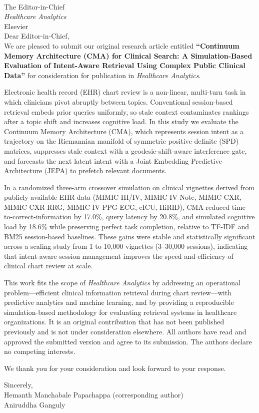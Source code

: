 \documentclass[12pt]{article}
\begin{document}
\begin{flushleft}
[Date]\\[2em]
\end{flushleft}

The Editor-in-Chief\\
\textit{Healthcare Analytics}\\
Elsevier\\[2em]

Dear Editor-in-Chief,\\[1em]

We are pleased to submit our original research article entitled \textbf{``Continuum Memory Architecture (CMA) for Clinical Search: A Simulation-Based Evaluation of Intent-Aware Retrieval Using Complex Public Clinical Data''} for consideration for publication in \textit{Healthcare Analytics}.

Electronic health record (EHR) chart review is a non-linear, multi-turn task in which clinicians pivot abruptly between topics. Conventional session-based retrieval embeds prior queries uniformly, so stale context contaminates rankings after a topic shift and increases cognitive load. In this study we evaluate the Continuum Memory Architecture (CMA), which represents session intent as a trajectory on the Riemannian manifold of symmetric positive definite (SPD) matrices, suppresses stale context with a geodesic-shift-aware interference gate, and forecasts the next latent intent with a Joint Embedding Predictive Architecture (JEPA) to prefetch relevant documents.

In a randomized three-arm crossover simulation on clinical vignettes derived from publicly available EHR data (MIMIC-III/IV, MIMIC-IV-Note, MIMIC-CXR, MIMIC-CXR-RRG, MIMIC-IV PPG-ECG, eICU, HiRID), CMA reduced time-to-correct-information by 17.0\%, query latency by 20.8\%, and simulated cognitive load by 18.6\% while preserving perfect task completion, relative to TF-IDF and BM25 session-based baselines. These gains were stable and statistically significant across a scaling study from 1 to 10{,}000 vignettes (3--30{,}000 sessions), indicating that intent-aware session management improves the speed and efficiency of clinical chart review at scale.

This work fits the scope of \textit{Healthcare Analytics} by addressing an operational problem---efficient clinical information retrieval during chart review---with predictive analytics and machine learning, and by providing a reproducible simulation-based methodology for evaluating retrieval systems in healthcare organizations. It is an original contribution that has not been published previously and is not under consideration elsewhere. All authors have read and approved the submitted version and agree to its submission. The authors declare no competing interests.

We thank you for your consideration and look forward to your response.

\vspace{2em}
Sincerely,\\[2em]

Hemanth Manchabale Papachappa (corresponding author)\\[1em]

Aniruddha Ganguly
\end{document}
